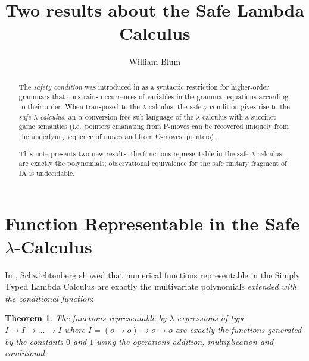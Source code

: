 \documentclass{article}
\author{William Blum}
\title{Two results about the Safe Lambda Calculus}
\newtheorem{theorem}{Theorem}[section]
\begin{document}
\maketitle

\begin{abstract}
The \emph{safety condition} was introduced in \cite{KNU02} as a syntactic restriction for higher-order grammars that constrains occurrences of variables in the grammar equations according to their order. When transposed to the $\lambda$-calculus, the safety condition gives rise to the \emph{safe $\lambda$-calculus}, an $\alpha$-conversion free sub-language of the $\lambda$-calculus with a succinct game semantics (i.e.\ pointers emanating from P-moves can be recovered uniquely from the underlying sequence of moves and from O-moves' pointers) \cite{blumtransfer}.

This note presents two new results: the functions representable in the safe $\lambda$-calculus are exactly the polynomials; observational equivalence for the safe finitary fragment of IA is undecidable.
\end{abstract}

\section{Function Representable in the Safe $\lambda$-Calculus}

In \cite{citeulike:622637}, Schwichtenberg showed that
numerical functions representable in the Simply Typed Lambda Calculus are exactly the multivariate polynomials \emph{extended with the conditional function}:
\begin{theorem}
The functions representable by $\lambda$-expressions of type $I\rightarrow I \rightarrow \ldots \rightarrow I$ where $I = (o\rightarrow o)\rightarrow o\rightarrow o$ are exactly the functions generated by the constants $0$ and $1$ using the operations addition, multiplication and conditional.
\end{theorem}
\end{document}
